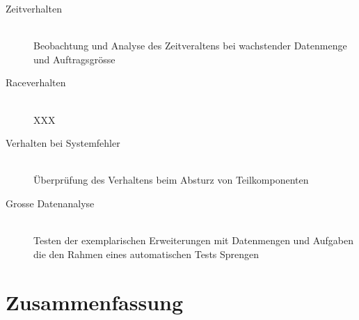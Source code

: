 \begin{description}
  \item[Zeitverhalten] \hfill \\
    Beobachtung und Analyse des Zeitveraltens bei wachstender Datenmenge und Auftragsgr\"osse
  \item[Raceverhalten] \hfill \\
    XXX
  \item[Verhalten bei Systemfehler]\hfill \\
    \"Uberpr\"ufung des Verhaltens beim Absturz von Teilkomponenten
  \item[Grosse Datenanalyse] \hfill \\
    Testen der exemplarischen Erweiterungen mit Datenmengen und Aufgaben
    die den Rahmen eines automatischen Tests Sprengen
\end{description}

\section{Zusammenfassung}

